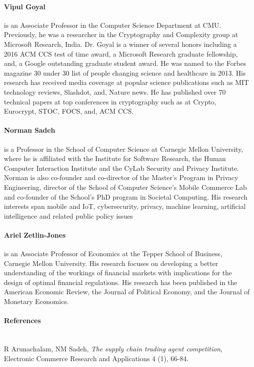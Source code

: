 \documentclass[runningheads, 12pt]{article}
\begin{document}
\paragraph{Vipul Goyal} is an Associate Professor in the Computer Science Department at CMU. Previously, he was a researcher in the Cryptography and Complexity group at Microsoft Research, India. Dr. Goyal is a winner of several honors including a 2016 ACM CCS test of time award, a Microsoft Research graduate fellowship, and, a Google outstanding graduate student award. He was named to the Forbes magazine 30 under 30 list of people changing science and healthcare in 2013. His research has received media coverage at popular science publications such as MIT technology reviews, Slashdot, and, Nature news. He has published over 70 technical papers at top conferences in cryptography such as at Crypto, Eurocrypt, STOC, FOCS, and, ACM CCS.


\paragraph{Norman Sadeh} is a Professor in the School of Computer Science at Carnegie Mellon University, where he is affiliated with the Institute for Software Research, the Human Computer Interaction Institute and the CyLab Security and Privacy Institute. Norman is also co-founder and co-director of the Master’s Program in Privacy Engineering, director of the School of Computer Science’s Mobile Commerce Lab and co-founder of the School’s PhD program in Societal Computing. His research interests span mobile and IoT, cybersecurity, privacy, machine learning, artificial intelligence and related public policy issues

\paragraph{Ariel Zetlin-Jones} is an Associate Professor of Economics at the Tepper School of Business, Carnegie Mellon University. His research focuses on developing a better understanding of the workings of financial markets with implications for the design of optimal financial regulations. His research has been published in the American Economic Review, the Journal of Political Economy, and the Journal of Monetary Economics.

\paragraph{References}~
\\
\vspace{-5pt}
\noindent[AS05] R Arunachalam, NM Sadeh, \emph{The supply chain trading agent competition},  Electronic Commerce Research and Applications 4 (1), 66-84.
\vspace{3pt}
\end{document}
